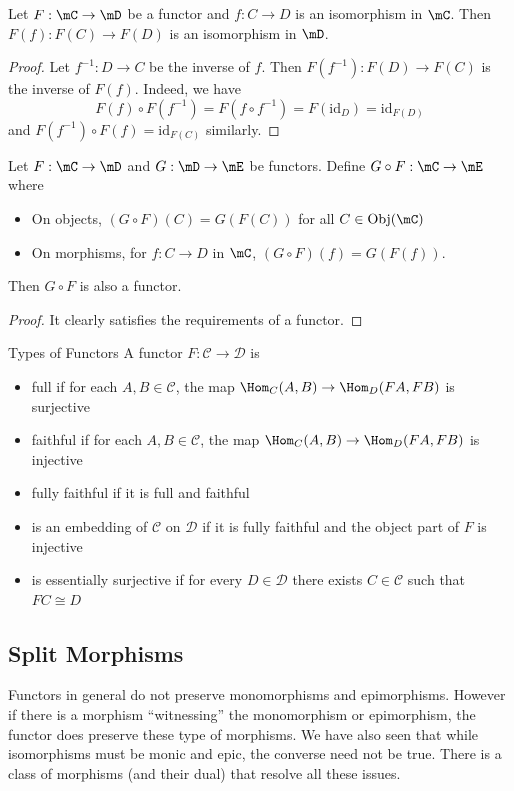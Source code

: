\documentclass[a4paper]{article}
\begin{document}
\begin{lmm}{}{} Let $F:\mC\to\mD$ be a functor and $f:C\to D$ is an isomorphism in $\mC$. Then $F(f):F(C)\to F(D)$ is an isomorphism in $\mD$. 
\begin{proof}
Let $f^{-1}:D\to C$ be the inverse of $f$. Then $F(f^{-1}):F(D)\to F(C)$ is the inverse of $F(f)$. Indeed, we have $$F(f)\circ F(f^{-1})=F(f\circ f^{-1})=F(\text{id}_D)=\text{id}_{F(D)}$$ and $F(f^{-1})\circ F(f)=\text{id}_{F(C)}$ similarly. 
\end{proof}
\end{lmm}

\begin{prp}{}{} Let $F:\mC\to\mD$ and $G:\mD\to\mE$ be functors. Define $G\circ F:\mC\to\mE$ where
\begin{itemize}
\item On objects, $(G\circ F)(C)=G(F(C))$ for all $C\in\text{Obj}(\mC)$
\item On morphisms, for $f:C\to D$ in $\mC$, $(G\circ F)(f)=G(F(f))$. 
\end{itemize} 
Then $G\circ F$ is also a functor. 
\begin{proof}
It clearly satisfies the requirements of a functor. 
\end{proof}
\end{prp}

\begin{defn}{Types of Functors}{} A functor $F:\mathcal{C}\to\mathcal{D}$ is 
\begin{itemize}
\item full if for each $A,B\in\mathcal{C}$, the map $\Hom_C(A,B)\to\Hom_D(FA,FB)$ is surjective
\item faithful if for each $A,B\in\mathcal{C}$, the map $\Hom_C(A,B)\to\Hom_D(FA,FB)$ is injective
\item fully faithful if it is full and faithful
\item is an embedding of $\mathcal{C}$ on $\mathcal{D}$ if it is fully faithful and the object part of $F$ is injective
\item is essentially surjective if for every $D\in\mathcal{D}$ there exists $C\in\mathcal{C}$ such that $FC\cong D$
\end{itemize}
\end{defn}

\subsection{Split Morphisms}
Functors in general do not preserve monomorphisms and epimorphisms. However if there is a morphism ``witnessing'' the monomorphism or epimorphism, the functor does preserve these type of morphisms. We have also seen that while isomorphisms must be monic and epic, the converse need not be true. There is a class of morphisms (and their dual) that resolve all these issues. 
\end{document}
